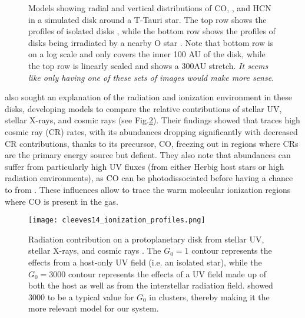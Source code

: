 \begin{figure}[t]
  \hspace*{\fill}%
  \vfill%
  \hspace*{\fill}%
  \caption{Models showing radial and vertical distributions of CO, \hco, and HCN in a simulated disk around a T-Tauri star. The top row shows the profiles of isolated disks \citep{Walsh2010}, while the bottom row shows the profiles of disks being irradiated by a nearby O star \citep{Walsh2013}. Note that bottom row is on a log scale and only covers the inner 100 AU of the disk, while the top row is linearly scaled and shows a 300AU stretch. \textit{It seems like only having one of these sets of images would make more sense.}}
  \label{fig:walsh-abundance-profs}
\end{figure}


\citet{Cleeves2013,Cleeves2014} also sought an explanation of the radiation and ionization environment in these disks, developing models to compare the relative contributions of stellar UV, stellar X-rays, and cosmic rays (see Fig.\ref{fig:disk_ionization}). Their findings showed that \hco traces high cosmic ray (CR) rates, with its abundances dropping significantly with decreased CR contributions, thanks to its precursor, CO, freezing out in regions where CRs are the primary energy source but defient. They also note that \hco abundances can suffer from particularly high UV fluxes (from either Herbig host stars or high radiation environments), as CO can be photodissociated before having a chance to from \hco. These influences allow \hco to trace the warm molecular ionization regions where CO is present in the gas.


\begin{figure}[t]
  \texttt{[image: cleeves14\_ionization\_profiles.png]}%
  \caption{Radiation contribution on a protoplanetary disk from stellar UV, stellar X-rays, and cosmic rays \citep{Cleeves2013}. The $G_0 = 1$ contour represents the effects from a host-only UV field (i.e. an isolated star), while the $G_0 = 3000$ contour represents the effects of a UV field made up of both the host as well as from the interstellar radiation field. \cite{Fatuzzo2008} showed 3000 to be a typical value for $G_0$ in clusters, thereby making it the more relevant model for our system.}
  \label{fig:disk_ionization}
\end{figure}

